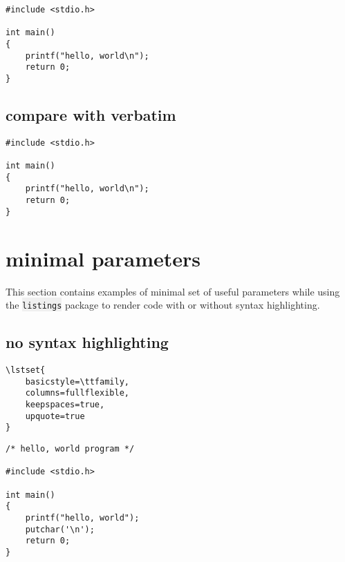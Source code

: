 \documentclass{article}
\newcommand{\ttt}[1]{\colorbox[HTML]{f0f0f0}{\texttt{#1}}}
\begin{document}
{
\lstset{
    basicstyle=\ttfamily,
    columns=fullflexible,
    keepspaces=true,
    language=c,
    showstringspaces=false,
}
\begin{lstlisting}
#include <stdio.h>

int main()
{
    printf("hello, world\n");
    return 0;
}
\end{lstlisting}
}

\subsection{compare with verbatim}
\begin{verbatim}
#include <stdio.h>

int main()
{
    printf("hello, world\n");
    return 0;
}
\end{verbatim}


\section{minimal parameters}
This section contains examples of minimal set of useful parameters while
using the \ttt{listings} package to render code with or without syntax
highlighting.

\subsection{no syntax highlighting}
{
\begin{lstlisting}
\lstset{
    basicstyle=\ttfamily,
    columns=fullflexible,
    keepspaces=true,
    upquote=true
}
\end{lstlisting}
}
{
\lstset{
    basicstyle=\ttfamily,
    columns=fullflexible,
    keepspaces=true,
    upquote=true
}
\begin{lstlisting}
/* hello, world program */

#include <stdio.h>

int main()
{
    printf("hello, world");
    putchar('\n');
    return 0;
}
\end{lstlisting}
}
\end{document}

